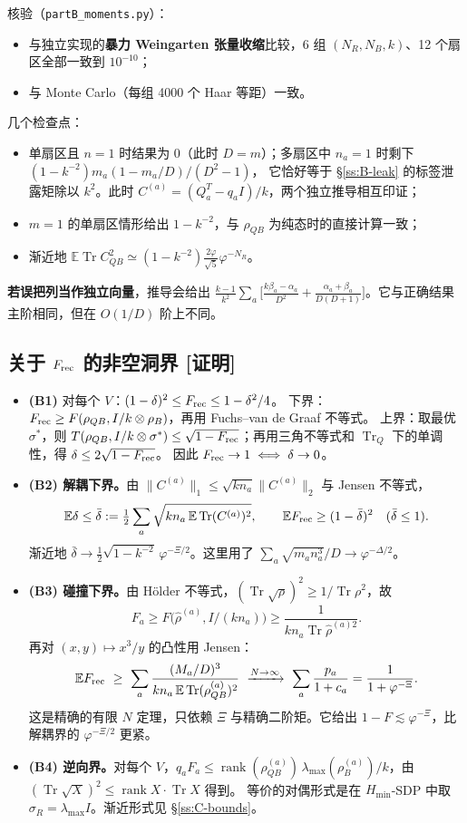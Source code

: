 \documentclass[11pt,a4paper,UTF8]{ctexart}
\newcommand{\Tr}{\operatorname{Tr}}
\newcommand{\E}{\mathbb{E}}
\newcommand{\Frec}{F_{\rm rec}}
\newcommand{\code}[1]{\texttt{#1}}
\newcommand{\tagP}{\texorpdfstring{\textcolor{cP}{\textbf{[证明]}}}{[证明]}}
\begin{document}
\smallskip
\noindent 核验（\code{partB\_moments.py}）：
\begin{itemize}
  \item 与独立实现的\textbf{暴力 Weingarten 张量收缩}比较，6 组 $(N_R,N_B,k)$、12 个扇区全部一致到 $10^{-10}$；
  \item 与 Monte Carlo（每组 4000 个 Haar 等距）一致。
\end{itemize}
几个检查点：
\begin{itemize}
  \item 单扇区且 $n=1$ 时结果为 0（此时 $D=m$）；多扇区中 $n_a=1$ 时剩下 $(1-k^{-2})m_a(1-m_a/D)/(D^2-1)$，
  它恰好等于 \S\ref{ss:B-leak} 的标签泄露矩除以 $k^2$。此时 $C^{(a)}=(Q_a^T-q_aI)/k$，两个独立推导相互印证；
  \item $m=1$ 的单扇区情形给出 $1-k^{-2}$，与 $\rho_{QB}$ 为纯态时的直接计算一致；
  \item 渐近地 $\E\Tr C_{QB}^2\simeq(1-k^{-2})\frac{2\varphi}{\sqrt5}\varphi^{-N_R}$。
\end{itemize}
\textbf{若误把列当作独立向量}，推导会给出 $\frac{k-1}{k^2}\sum_a\big[\frac{k\beta_a-\alpha_a}{D^2}+\frac{\alpha_a+\beta_a}{D(D+1)}\big]$。它与正确结果主阶相同，但在 $O(1/D)$ 阶上不同。

\subsection{关于 \texorpdfstring{$\Frec$}{F\_rec} 的非空洞界 \tagP}\label{ss:B-bounds}
\begin{itemize}
  \item \textbf{(B1)} 对每个 $V$：$(1-\delta)^2\le\Frec\le1-\delta^2/4$。
  下界：$\Frec\ge F(\rho_{QB},I/k\otimes\rho_B)$，再用 Fuchs--van de Graaf 不等式。
  上界：取最优 $\sigma^{*}$，则 $T(\rho_{QB},I/k\otimes\sigma^{*})\le\sqrt{1-\Frec}$；再用三角不等式和 $\Tr_Q$ 下的单调性，得 $\delta\le2\sqrt{1-\Frec}$。
  因此 $\Frec\to1\iff\delta\to0$。
  \item \textbf{(B2) 解耦下界。}由 $\|C^{(a)}\|_1\le\sqrt{kn_a}\|C^{(a)}\|_2$ 与 Jensen 不等式，
  \[
  \E\delta\le\bar\delta:=\tfrac12\sum_a\sqrt{kn_a\,\E\Tr(C^{(a)})^2},\qquad \E\Frec\ge(1-\bar\delta)^2\quad(\bar\delta\le1).
  \]
  渐近地 $\bar\delta\to\frac12\sqrt{1-k^{-2}}\,\varphi^{-\Xi/2}$。这里用了 $\sum_a\sqrt{m_an_a^3}/D\to\varphi^{-\Delta/2}$。
  \item \textbf{(B3) 碰撞下界。}由 Hölder 不等式，$(\Tr\sqrt\rho)^2\ge1/\Tr\rho^2$，故
  \[F_a\ge F\big(\hat\rho^{(a)},I/(kn_a)\big)\ge\frac{1}{kn_a\Tr\hat\rho^{(a)2}}.\]
  再对 $(x,y)\mapsto x^3/y$ 的凸性用 Jensen：
  \[
  \E\Frec\ \ge\ \sum_a\frac{(M_a/D)^3}{kn_a\,\E\Tr(\rho^{(a)}_{QB})^2}\ \xrightarrow{N\to\infty}\ \sum_a\frac{p_a}{1+c_a}=\frac1{1+\varphi^{-\Xi}}.
  \]
  这是精确的有限 $N$ 定理，只依赖 $\Xi$ 与精确二阶矩。它给出 $1-F\lesssim\varphi^{-\Xi}$，比解耦界的 $\varphi^{-\Xi/2}$ 更紧。
  \item \textbf{(B4) 逆向界。}对每个 $V$，$q_aF_a\le\operatorname{rank}(\rho^{(a)}_{QB})\,\lambda_{\max}(\rho^{(a)}_B)/k$，由 $(\Tr\sqrt X)^2\le\operatorname{rank}X\cdot\Tr X$ 得到。
  等价的对偶形式是在 $H_{\min}$-SDP 中取 $\sigma_R=\lambda_{\max}I$。渐近形式见 \S\ref{ss:C-bounds}。
\end{itemize}
\end{document}
